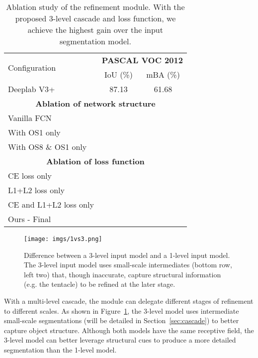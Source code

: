 \documentclass[10pt,twocolumn,letterpaper]{article}
\begin{document}
\begin{table}[t]
\centering
\begin{tabular}{l|c|c}
  \multirow{2}{*}{Configuration} & \multicolumn{2}{c}{\textbf{PASCAL VOC 2012}}\\
  & IoU (\%) & mBA (\%)\\
  \hhline{|=|=|=|}
  Deeplab V3+ & 87.13 & 61.68 \\
  \hline
  \multicolumn{3}{c}{\textbf{Ablation of network structure}} \\
  \Xhline{2\arrayrulewidth}
  Vanilla FCN &  &  \\
  With OS1 only &  &  \\
  With OS8 \& OS1 only &  &  \\
  \hline
  \multicolumn{3}{c}{\textbf{Ablation of loss function}} \\
  \Xhline{2\arrayrulewidth}
  CE loss only &  &  \\
  L1+L2 loss only &  &  \\
  CE and L1+L2 loss only  &  &  \\
  \Xhline{3\arrayrulewidth}
  Ours - Final &  &  \\
\end{tabular}
\caption{Ablation study of the refinement module. With the proposed 3-level cascade and loss function, we achieve the highest gain over the input segmentation model.}
\label{tab:ablation_rm}
\vspace{-0.15in}
\end{table}


\begin{figure}[t]
	\begin{center}
		\texttt{[image: imgs/1vs3.png]}
	\end{center}
	\vspace{-0.15in}
	\caption{Difference between a 3-level input model and a 1-level input model. The 3-level input model uses small-scale intermediates (bottom row, left two) that, though inaccurate, capture structural information (e.g. the tentacle) to be refined at the later stage.}
	\label{fig:1vs3}
	\vspace{-0.15in}
\end{figure}

With a multi-level cascade, the module can delegate different stages of refinement to different scales. 
As shown in Figure~\ref{fig:1vs3},  the 3-level model uses intermediate small-scale segmentations (will be detailed in Section~\ref{sec:cascade}) to better capture object structure. 
Although both models have the same receptive field, the 3-level model can better leverage structural cues to produce a more detailed segmentation than the 1-level model.
\end{document}
